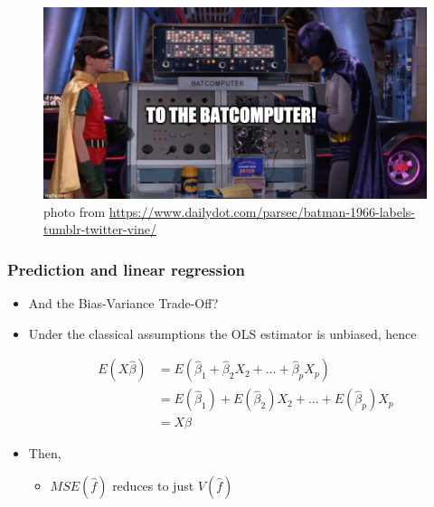 \documentclass[
  shownotes,
  xcolor={svgnames},
  hyperref={colorlinks,citecolor=DarkBlue,linkcolor=andesred,urlcolor=DarkBlue}
  , aspectratio=169]{beamer}
\begin{document}
\begin{frame}

\begin{figure}[H] \centering
  \centering
  \includegraphics[scale=0.35]{figures/baticomputer_meme.jpg}
  \\
  \tiny photo from \url{https://www.dailydot.com/parsec/batman-1966-labels-tumblr-twitter-vine/}
\end{figure}

\end{frame}
\begin{frame}
\frametitle{Prediction and linear regression}

\begin{itemize}
  \item And the Bias-Variance Trade-Off?
  \pause
  \item Under the classical assumptions the OLS estimator is unbiased, hence 

\medskip
\begin{align}
  E( X \hat \beta)&= E(\hat{\beta}_1 + \hat{\beta}_2 X_2 + \dots + \hat{\beta}_p X_p) \\ 
  &= E(\hat{\beta}_1) + E(\hat{\beta}_2) X_2 + \dots + E(\hat{\beta}_p) X_p  \\ 
  &= X \beta
\end{align}
\medskip




\item Then, 

\begin{itemize}
  \item $MSE(\hat f)$ reduces to just $V(\hat f)$
\end{itemize} 



\end{itemize}

\end{frame}
\end{document}
